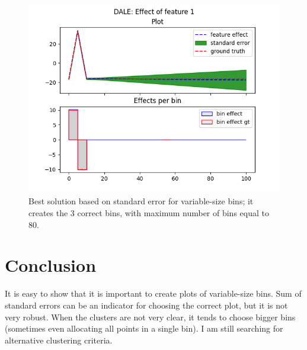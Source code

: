 \documentclass{article}
\begin{document}
\begin{figure}[h]
\centering
\includegraphics[width=0.9\linewidth]{Figure_11.png}
\caption{Best solution based on standard error for variable-size bins; it creates the 3 correct bins, with maximum number of bins equal to 80.}
\label{im:best-var}
\end{figure}

\section{Conclusion}

It is easy to show that it is important to create plots of
variable-size bins. Sum of standard errors can be an indicator for
choosing the correct plot, but it is not very robust. When the
clusters are not very clear, it tends to choose bigger bins (sometimes
even allocating all points in a single bin). I am still searching for
alternative clustering criteria.
\end{document}
